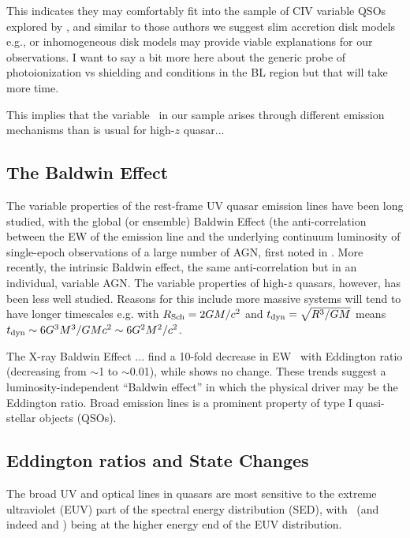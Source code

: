 \documentclass[a4paper,fleqn,usenatbib]{mnras}
\begin{document}
This indicates they may comfortably fit into the sample of CIV
variable QSOs explored by \citet{Dyer2019}, and similar to those
authors we suggest slim accretion disk models e.g., 
\citet[][]{Abramowicz1988} or inhomogeneous disk models
\citep[e.g.,][]{DexterAgol2011} may provide viable explanations for
our observations. I want to say a bit more here about the generic
probe of photoionization vs shielding and conditions in the BL region
but that will take more time.

This implies that the variable \civ\ in our sample arises through
different emission mechanisms than is usual for high-$z$ quasar...


\subsection{The Baldwin Effect}
The variable properties of the rest-frame UV quasar emission lines
have been long studied, with the global (or ensemble) Baldwin Effect
(the anti-correlation between the EW of the emission line and the
underlying continuum luminosity of single-epoch observations of a
large number of AGN, first noted in \citet{Baldwin1977}.  More
recently, the intrinsic Baldwin effect, the same anti-correlation but
in an individual, variable AGN.  The variable properties of high-$z$
quasars, however, has been less well studied. Reasons for this include
more massive systems will tend to have longer timescales e.g. with
$R_{\rm Sch}= 2GM /c^{2}$ and $t_{\rm dyn} =\sqrt{ R^{3}/GM}$ means
$t_{\rm dyn} \sim 6 G^{3} M^{3} / GM c^{2} \sim 6G^{2} M^{2} / c^{2}
$.

The X-ray Baldwin Effect \citep[e.g., ][]{Iwasawa_Taniguchi1993}... 
\citet{Bachev2004} find a 10-fold decrease in EW \civ\ with Eddington
ratio (decreasing from $\sim$1 to $\sim$0.01), while \nv shows no
change. These trends suggest a luminosity-independent ``Baldwin
effect'' in which the physical driver may be the Eddington ratio.
\citet{Ge2016} Broad emission lines is a prominent property of type I quasi-stellar objects (QSOs). 




\subsection{Eddington ratios and State Changes} 
The broad UV and optical lines in quasars are most sensitive to the
extreme ultraviolet (EUV) part of the spectral energy distribution
(SED), with \civ\ (and indeed \heii and \nv) being at the higher
energy end of the EUV distribution.
\end{document}
